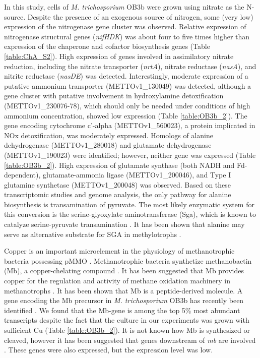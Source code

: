 In this study, cells of \textit{M. trichosporium} OB3b were grown using nitrate as the N-source.
Despite the presence of an exogenous source of nitrogen, some (very low) expression of the nitrogenase gene cluster was observed.
Relative expression of nitrogenase structural genes (\textit{nifHDK}) was about four to five times higher than expression of the chaperone and cofactor biosynthesis genes (Table \ref{table:ChA_S2}).
High expression of genes involved in assimilatory nitrate reduction, including the nitrate transporter (\textit{nrtA}), nitrate reductase (\textit{nasA}), and nitrite reductase (\textit{nasDE}) was detected.
Interestingly, moderate expression of a putative ammonium transporter (METTOv1\_130049) was detected, although a gene cluster with putative involvement in hydroxylamine detoxification (METTOv1\_230076-78), which should only be needed under conditions of high ammonium concentration, showed low expression (Table \ref{table:OB3b_2}).
The gene encoding cytochrome c'-alpha (METTOv1\_560023), a protein implicated in NOx detoxification, was moderately expressed.
Homologs of alanine dehydrogenase (METTOv1\_280018) and glutamate dehydrogenase (METTOv1\_190023) were identified; however, neither gene was expressed (Table \ref{table:OB3b_2}).
High expression of glutamate synthase (both NADH and Fd-dependent), glutamate-ammonia ligase (METTOv1\_200046), and Type I glutamine synthetase (METTOv1\_200048) was observed.
Based on these transcriptomic studies and genome analysis, the only pathway for alanine biosynthesis is transamination of pyruvate.
The most likely enzymatic system for this conversion is the serine-glyoxylate aminotransferase (Sga), which is known to catalyze serine-pyruvate transamination \cite{liepman2001}.
It has been shown that alanine may serve as alternative substrate for SGA in methylotrophs \cite{karsten2001}.

Copper is an important microelement in the physiology of methanotrophic bacteria possessing pMMO \cite{anthony1982}.
Methanotrophic bacteria synthetize methanobactin (Mb), a copper-chelating compound \cite{kim2004, balasubramanian2008, semrau2010}.
It has been suggested that Mb provides copper for the regulation and activity of methane oxidation machinery in methanotrophs \cite{balasubramanian2010, semrau2010}.
It has been shown that Mb is a peptide-derived molecule.
A gene encoding the Mb precursor in \textit{M. trichosporium} OB3b has recently been identified \cite{krentz2010}.
We found that the Mb-gene is among the top 5\% most abundant transcripts despite the fact that the culture in our experiments was grown with sufficient Cu (Table \ref{table:OB3b_2}).
It is not known how Mb is synthesized or cleaved, however it has been suggested that genes downstream of \textit{mb} are involved \cite{krentz2010}.
These genes were also expressed, but the expression level was low.

